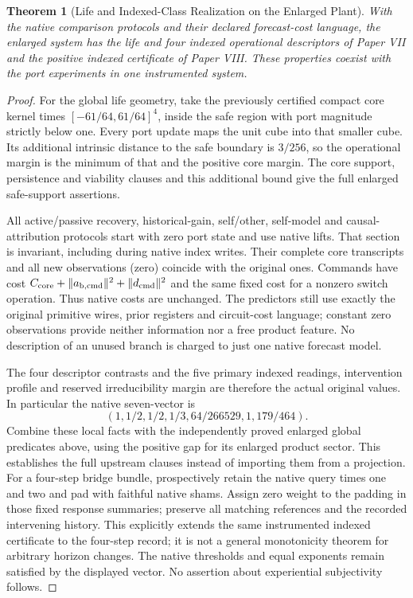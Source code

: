 \documentclass[11pt,a4paper]{article}
\newtheorem{theorem}{Theorem}[section]
\theoremstyle{definition}
\begin{document}
\begin{theorem}[Life and Indexed-Class Realization on the Enlarged Plant]
\label{thm:bridge-quartic-indexed-inheritance}
With the native comparison protocols and their declared forecast-cost language,
the enlarged system has the life and four indexed operational descriptors
of Paper VII and the positive indexed certificate of Paper VIII. These
properties coexist with the port experiments in one instrumented system.
\end{theorem}
\begin{proof}
For the global life geometry, take the previously certified compact core
kernel times $[-61/64,61/64]^4$, inside the safe region with port magnitude
strictly below one. Every port update maps the unit cube into that smaller
cube. Its additional intrinsic distance to the safe boundary is $3/256$,
so the operational margin is the minimum of that and the positive core
margin. The core support, persistence and viability clauses and this
additional bound give the full enlarged safe-support assertions.

All active/passive recovery, historical-gain, self/other, self-model and
causal-attribution protocols start with zero port state and use native lifts.
That section is invariant, including during native index writes. Their
complete core transcripts and all new observations (zero) coincide with the
original ones. Commands have cost $C_{\rm core}+\|a_{\rm b,cmd}\|^2+\|d_{\rm cmd}\|^2$
and the same fixed cost for a nonzero switch operation. Thus native costs
are unchanged. The predictors still use exactly the original primitive
wires, prior registers and circuit-cost language; constant zero observations
provide neither information nor a free product feature. No description of
an unused branch is charged to just one native forecast model.

The four descriptor contrasts and the five primary indexed readings,
intervention profile and reserved irreducibility margin are therefore the
actual original values. In particular the native seven-vector is
\[
 (1,1/2,1/2,1/3,64/266529,1,179/464).
\]
Combine these local facts with the independently proved enlarged global
predicates above, using the positive gap for its enlarged product sector.
This establishes the full upstream clauses instead of importing them from
a projection. For a four-step bridge bundle, prospectively retain the native
query times one and two and pad with faithful native shams. Assign zero
weight to the padding in those fixed response summaries; preserve all
matching references and the recorded intervening history. This explicitly
extends the same instrumented indexed certificate to the four-step record;
it is not a general monotonicity theorem for arbitrary horizon changes.
The native thresholds and equal exponents remain satisfied by the displayed
vector. No assertion about experiential subjectivity follows.
\end{proof}
\end{document}
